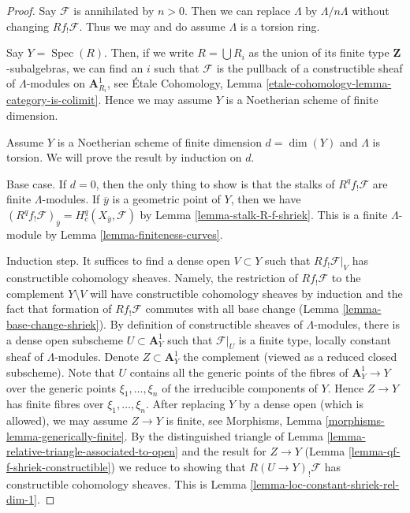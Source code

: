 \documentclass{stacks-project}
\theoremstyle{plain}
\theoremstyle{definition}
\theoremstyle{remark}
\numberwithin{equation}{subsection}
\def\Spec{\mathop{\mathrm{Spec}}}
\begin{document}
\begin{proof}
Say $\mathcal{F}$ is annihilated by $n > 0$. Then we can replace
$\Lambda$ by $\Lambda/n\Lambda$ without changing $Rf_!\mathcal{F}$.
Thus we may and do assume $\Lambda$ is a torsion ring.

\medskip\noindent
Say $Y = \Spec(R)$. Then, if we write
$R = \bigcup R_i$ as the union of its finite type $\mathbf{Z}$-subalgebras,
we can find an $i$ such that $\mathcal{F}$ is the pullback of
a constructible sheaf of $\Lambda$-modules on $\mathbf{A}^1_{R_i}$, see
\'Etale Cohomology, Lemma \ref{etale-cohomology-lemma-category-is-colimit}.
Hence we may assume $Y$ is a Noetherian scheme of finite dimension.

\medskip\noindent
Assume $Y$ is a Noetherian scheme of finite dimension $d = \dim(Y)$
and $\Lambda$ is torsion. We will prove the result by induction on $d$.

\medskip\noindent
Base case. If $d = 0$, then the only thing to show is that the stalks
of $R^qf_!\mathcal{F}$ are finite $\Lambda$-modules.
If $\overline{y}$ is a geometric point of $Y$, then we have
$(R^qf_!\mathcal{F})_{\overline{y}} = H^q_c(X_{\overline{y}}, \mathcal{F})$
by Lemma \ref{lemma-stalk-R-f-shriek}.
This is a finite $\Lambda$-module by Lemma \ref{lemma-finiteness-curves}.

\medskip\noindent
Induction step. It suffices to find a dense open $V \subset Y$ such
that $Rf_!\mathcal{F}|_V$ has constructible cohomology sheaves. Namely, the
restriction of $Rf_!\mathcal{F}$ to the complement $Y \setminus V$
will have constructible cohomology sheaves by induction
and the fact that formation of $Rf_!\mathcal{F}$ commutes
with all base change (Lemma \ref{lemma-base-change-shriek}).
By definition of constructible sheaves of $\Lambda$-modules, there is a dense
open subscheme $U \subset \mathbf{A}^1_Y$ such that $\mathcal{F}|_U$
is a finite type, locally constant sheaf of $\Lambda$-modules.
Denote $Z \subset \mathbf{A}^1_Y$ the complement (viewed as a reduced
closed subscheme). Note that $U$ contains all the generic points of the
fibres of $\mathbf{A}^1_Y \to Y$ over the generic points
$\xi_1, \ldots, \xi_n$ of the irreducible components of $Y$.
Hence $Z \to Y$ has finite fibres over $\xi_1, \ldots, \xi_n$.
After replacing $Y$ by a dense open (which is allowed), we may
assume $Z \to Y$ is finite, see
Morphisms, Lemma \ref{morphisms-lemma-generically-finite}.
By the distinguished triangle of
Lemma \ref{lemma-relative-triangle-associated-to-open}
and the result for $Z \to Y$ (Lemma \ref{lemma-qf-f-shriek-constructible})
we reduce to showing that
$R(U \to Y)_!\mathcal{F}$ has constructible cohomology sheaves.
This is Lemma \ref{lemma-loc-constant-shriek-rel-dim-1}.
\end{proof}
\end{document}
